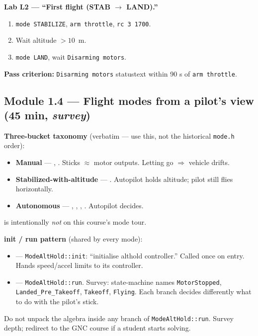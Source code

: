 \documentclass[a4paper,11pt,twoside]{article}
\renewcommand{\instnote}[1]{\ifinstructor\begin{tcolorbox}[colback=blue!4!white,colframe=blue!40!black,title=Instructor note,breakable]#1\end{tcolorbox}\fi}
\begin{document}
\textbf{Lab L2 --- ``First flight (STAB $\rightarrow$ LAND).''}
\begin{enumerate}
  \item \texttt{mode STABILIZE}, \texttt{arm throttle}, \texttt{rc 3 1700}.
  \item Wait altitude $> 10$~m.
  \item \texttt{mode LAND}, wait \texttt{Disarming motors}.
\end{enumerate}
\textbf{Pass criterion:} \texttt{Disarming motors} statustext within 90 s of \texttt{arm throttle}.

\subsection{Module 1.4 --- Flight modes from a pilot's view (45 min, \emph{survey})}

\textbf{Three-bucket taxonomy} (verbatim --- use this, not the historical \texttt{mode.h} order):
\begin{itemize}
  \item \textbf{Manual} --- , . Sticks $\approx$ motor outputs. Letting go $\Rightarrow$ vehicle drifts.
  \item \textbf{Stabilized-with-altitude} --- . Autopilot holds altitude; pilot still flies horizontally.
  \item \textbf{Autonomous} --- , , , . Autopilot decides.
\end{itemize}
 is intentionally \emph{not} on this course's mode tour.

\textbf{init / run pattern} (shared by every mode):
\begin{itemize}
  \item {} --- \texttt{ModeAltHold::init}: ``initialise althold controller.'' Called once on entry. Hands speed/accel limits to its controller.
  \item {} --- \texttt{ModeAltHold::run}. Survey: state-machine names \texttt{MotorStopped}, \texttt{Landed\_Pre\_Takeoff}, \texttt{Takeoff}, \texttt{Flying}. Each branch decides differently what to do with the pilot's stick.
\end{itemize}
\instnote{Do not unpack the algebra inside any branch of \texttt{ModeAltHold::run}. Survey depth; redirect to the GNC course if a student starts solving.}
\end{document}
